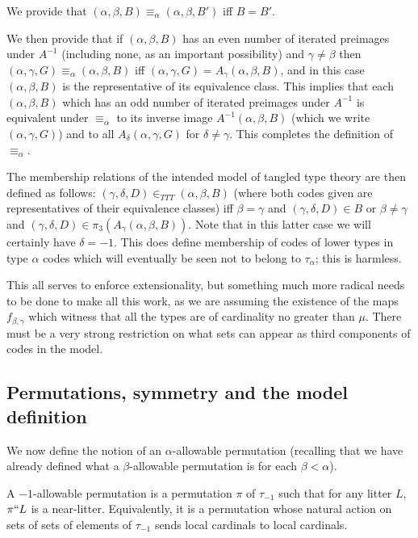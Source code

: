 \documentclass[112pt]{article}
\begin{document}
We provide that $(\alpha,\beta,B) \equiv_{\alpha} (\alpha,\beta,B')$ iff $B=B'$.

We then provide that if $(\alpha,\beta,B)$ has an even number of iterated preimages under $A^{-1}$ (including none, as an important possibility) and $\gamma \neq \beta$ then $(\alpha,\gamma,G) \equiv_{\alpha} (\alpha,\beta,B)$ iff  $(\alpha,\gamma,G)=A_\gamma(\alpha,\beta,B)$, and in this case $(\alpha,\beta,B)$ is the representative of its equivalence class.
This implies that each $(\alpha,\beta,B)$ which has an odd number of iterated preimages under $A^{-1}$ is equivalent under $\equiv_\alpha$ to
its inverse image $A^{-1}(\alpha,\beta,B)$ (which we write $(\alpha,\gamma,G)$) and to all $A_{\delta}(\alpha,\gamma,G)$ for
$\delta \neq \gamma$.  This completes the definition of $\equiv_\alpha$.

The membership relations of the intended model of tangled type theory are then defined as follows: $(\gamma,\delta,D) \in_{TTT} (\alpha,\beta,B)$ (where both codes given are representatives of their equivalence classes) iff $\beta=\gamma$ and
$(\gamma,\delta,D)  \in B$ or $\beta\neq \gamma$ and $(\gamma,\delta,D) \in \pi_3(A_{\gamma}(\alpha,\beta,B))$.  Note that in this latter case we will certainly have $\delta=-1$.  This does define membership of codes of lower types in
type $\alpha$ codes which will eventually be seen not to belong to $\tau_\alpha$;  this is harmless.

This all serves to enforce extensionality, but something much more radical needs to be done to make all this work, as we are assuming the existence of the maps $f_{\beta,\gamma}$ which witness that all the types are of cardinality no greater than $\mu$.  There must be a very strong restriction on what sets can appear as third components of codes in the model.

\subsection{Permutations, symmetry and the model definition}

We now define the notion of an $\alpha$-allowable permutation (recalling that we have already defined what a $\beta$-allowable permutation is for each $\beta<\alpha$).

A $-1$-allowable permutation is a permutation $\pi$ of $\tau_{-1}$ such that for any litter $L$, $\pi``L$ is a near-litter.  Equivalently, it is a permutation whose natural action on sets of sets of elements of $\tau_{-1}$ sends local cardinals to local cardinals.
\end{document}
